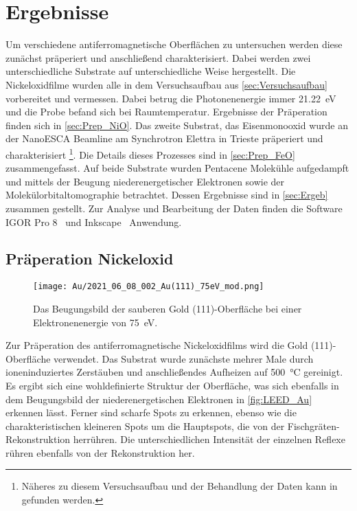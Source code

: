 \chapter{Ergebnisse}
    Um verschiedene antiferromagnetische Oberflächen zu untersuchen werden diese zunächst präperiert und anschließend charakterisiert.
    Dabei werden zwei unterschiedliche Substrate auf unterschiedliche Weise hergestellt.
    Die Nickeloxidfilme wurden alle in dem Versuchsaufbau aus \autoref{sec:Versuchsaufbau} vorbereitet und vermessen.
    Dabei betrug die Photonenenergie immer \SI{21.22}{\electronvolt} und die Probe befand sich bei Raumtemperatur.
    Ergebnisse der Präperation finden sich in \autoref{sec:Prep_NiO}.
    Das zweite Substrat, das Eisenmonooxid wurde an der NanoESCA Beamline am Synchrotron Elettra in Trieste präperiert und charakterisiert \footnote{Näheres zu diesem Versuchsaufbau und der Behandlung der Daten kann in~\cite{ma-DJ} gefunden werden.}.
    Die Details dieses Prozesses sind in \autoref{sec:Prep_FeO} zusammengefasst.
    Auf beide Substrate wurden Pentacene Molekühle aufgedampft und mittels der Beugung niederenergetischer Elektronen sowie der Molekülorbitaltomographie betrachtet.
    Dessen Ergebnisse sind in \autoref{sec:Ergeb} zusammen gestellt.
    Zur Analyse und Bearbeitung der Daten finden die Software IGOR Pro 8~\cite{IGOR} und Inkscape~\cite{Inkscape} Anwendung.

    \section{Präperation Nickeloxid} \label{sec:Prep_NiO}
        \begin{figure}
            \centering
            \texttt{[image: Au/2021\_06\_08\_002\_Au(111)\_75eV\_mod.png]}            
            \caption{Das Beugungsbild der sauberen Gold (111)-Oberfläche bei einer Elektronenenergie von \SI{75}{\electronvolt}.}
            \label{fig:LEED_Au}
        \end{figure}
        Zur Präperation des antiferromagnetische Nickeloxidfilms wird die Gold (111)-Oberfläche verwendet.
        Das Substrat wurde zunächste mehrer Male durch ioneninduziertes Zerstäuben und anschließendes Aufheizen auf \SI{500}{\celsius} gereinigt.
        Es ergibt sich eine wohldefinierte Struktur der Oberfläche, was sich ebenfalls in dem Beugungsbild der niederenergetischen Elektronen in \autoref{fig:LEED_Au} erkennen lässt.
        Ferner sind scharfe Spots zu erkennen, ebenso wie die charakteristischen kleineren Spots um die Hauptspots, die von der Fischgräten-Rekonstruktion herrühren.
        Die unterschiedlichen Intensität der einzelnen Reflexe rühren ebenfalls von der Rekonstruktion her.

